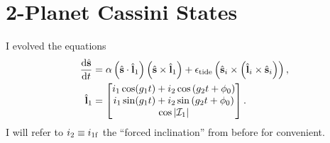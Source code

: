 \documentclass[11pt,
        usenames, %
        dvipsnames %
    ]{article}
\newcommand*{\rd}[2]{\frac{\mathrm{d}#1}{\mathrm{d}#2}}
\newcommand*{\bm}[1]{\boldsymbol{\mathbf{#1}}}
\newcommand*{\uv}[1]{\hat{\bm{#1}}}
\newcommand*{\abs}[1]{\left|#1\right|}
\newcommand*{\p}[1]{\left(#1\right)}
\begin{document}
\section{2-Planet Cassini States}

I evolved the equations
\begin{align}
    \rd{\uv{s}}{t} &= \alpha\p{\uv{s} \cdot \uv{l}_1}\p{\uv{s} \times
        \uv{l}_1} + \epsilon_{\rm tide}\p{\uv{s}_i \times \p{\uv{l}_i \times
        \uv{s}_i} },\\
    \uv{l}_1 &= \begin{bmatrix}
            i_1 \cos (g_1t) + i_2 \cos\p{g_2 t + \phi_0}\\
            i_1 \sin (g_1t) + i_2 \sin\p{g_2 t + \phi_0}\\
            \cos\abs{\mathcal{I}_1}
        \end{bmatrix}.
\end{align}
I will refer to $i_2 \equiv i_{\rm 1f}$ the ``forced inclination'' from before
for convenient.
\end{document}
